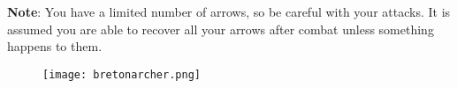 \begin{tcolorbox}
\textbf{Note}: You have a limited number of arrows, so be careful with your attacks. It is assumed you are able to recover all your arrows after combat unless something happens to them.
\end{tcolorbox}

\begin{figure}[h]
	\texttt{[image: bretonarcher.png]}
\end{figure}